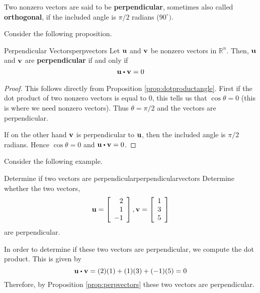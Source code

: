 Two nonzero  vectors are said to be \textbf{perpendicular}, sometimes also called \textbf{orthogonal}, if
the included angle is $\pi /2$ radians ($90^{\circ }).$

Consider the following proposition.

\begin{proposition}{Perpendicular Vectors}{perpvectors}
Let ${\bf u}$ and ${\bf v}$ be nonzero vectors in $\mathbb{R}^n$. Then, 
${\bf u}$ and ${\bf v}$ are \textbf{perpendicular} if and only if
\begin{equation*}
\vect{u}
\dotprod
\vect{v}
=
0
\end{equation*}
\end{proposition}

\begin{proof}
This follows directly from Proposition \ref{prop:dotproductangle}. First if the dot product of
two nonzero vectors is equal to $0$, this tells us that $\cos \theta
=0$ (this is where we need nonzero vectors). Thus $\theta = \pi /2$
and the vectors are perpendicular.

If on the other hand ${\bf v}$ is perpendicular to ${\bf u}$, then 
the included angle is $\pi /2$ radians. Hence $\cos \theta =0$ and 
$\vect{u} \dotprod \vect{v} = 0$.
\end{proof}

Consider the following example.

\begin{example}{Determine if two vectors are perpendicular}{perpendicularvectors}
Determine whether the two vectors, 
\begin{equation*}
{\bf u}=
\left[
\begin{array}{r}
2 \\
1 \\
-1 
\end{array}
\right], 
{\bf v} 
=
\left[
\begin{array}{r}
1 \\
3 \\
5
\end{array}
\right]
\end{equation*}
 are perpendicular.
\end{example}

\begin{solution}
In order to determine if these two vectors are perpendicular, we compute the dot product.
This is given by
\begin{equation*}
\vect{u} \dotprod \vect{v}
=
(2)(1) + (1)(3) + (-1)(5)
=
0
\end{equation*}
Therefore, by Proposition \ref{prop:perpvectors} these two vectors are perpendicular.
\end{solution}
